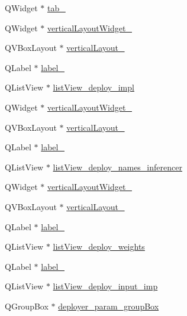 \begin{DoxyCompactItemize}
Q\+Widget $\ast$ \hyperlink{class_ui___main_window_a7d8a29446578759800fab35c698b6be2}{tab\+\_}
\item 
Q\+Widget $\ast$ \hyperlink{class_ui___main_window_a3df209794cbf492827906b7f440eb831}{vertical\+Layout\+Widget\+\_}
\item 
Q\+V\+Box\+Layout $\ast$ \hyperlink{class_ui___main_window_a536714c33f60a411653b417227c0a670}{vertical\+Layout\+\_}
\item 
Q\+Label $\ast$ \hyperlink{class_ui___main_window_af1f53b35a7e707318cbd6a775309e5ce}{label\+\_}
\item 
Q\+List\+View $\ast$ \hyperlink{class_ui___main_window_ac209aaab279a5e4ab44a1ffc846f7a14}{list\+View\+\_\+deploy\+\_\+impl}
\item 
Q\+Widget $\ast$ \hyperlink{class_ui___main_window_a737dcab9226e92cfa2e810f75e49b38d}{vertical\+Layout\+Widget\+\_}
\item 
Q\+V\+Box\+Layout $\ast$ \hyperlink{class_ui___main_window_a6a019f3fa43181f4f848b92fd10fc783}{vertical\+Layout\+\_}
\item 
Q\+Label $\ast$ \hyperlink{class_ui___main_window_a31fc1e3e6c2d61c1dc50e96b6a60344d}{label\+\_}
\item 
Q\+List\+View $\ast$ \hyperlink{class_ui___main_window_a81f22d7b4679c67bbd566de49a216964}{list\+View\+\_\+deploy\+\_\+names\+\_\+inferencer}
\item 
Q\+Widget $\ast$ \hyperlink{class_ui___main_window_afd7f684c1bd9d5a6f9eac11eedff071b}{vertical\+Layout\+Widget\+\_}
\item 
Q\+V\+Box\+Layout $\ast$ \hyperlink{class_ui___main_window_ae0fcc85c6af290d1ba9d090c6856b217}{vertical\+Layout\+\_}
\item 
Q\+Label $\ast$ \hyperlink{class_ui___main_window_ad8951142a7b5408cf5f0f3b10c79a1a4}{label\+\_}
\item 
Q\+List\+View $\ast$ \hyperlink{class_ui___main_window_a7327a1d748eaca8cc04133206e9a7d66}{list\+View\+\_\+deploy\+\_\+weights}
\item 
Q\+Label $\ast$ \hyperlink{class_ui___main_window_aa17035f397a9d71a7d18d65f47a8bcf1}{label\+\_}
\item 
Q\+List\+View $\ast$ \hyperlink{class_ui___main_window_a6284aea58aa9d054802ff5a0d92da8d4}{list\+View\+\_\+deploy\+\_\+input\+\_\+imp}
\item 
Q\+Group\+Box $\ast$ \hyperlink{class_ui___main_window_ac30348f085fd0f224b083385690c47c8}{deployer\+\_\+param\+\_\+group\+Box}
\item 

\end{DoxyCompactItemize}
